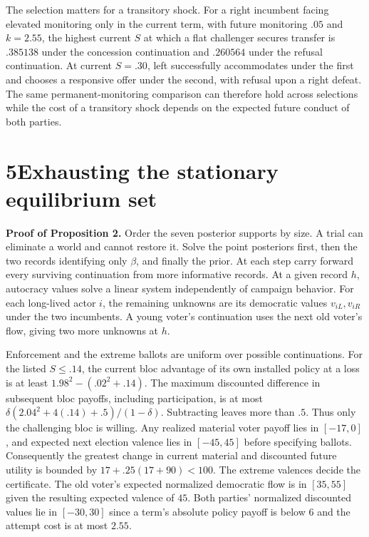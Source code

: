 \documentclass[11pt,letterpaper]{article}
\begin{document}
The selection matters for a transitory shock. For a right incumbent facing elevated monitoring only in the current term, with future monitoring $.05$ and $k=2.55$, the highest current $S$ at which a flat challenger secures transfer is $.385138$ under the concession continuation and $.260564$ under the refusal continuation. At current $S=.30$, left successfully accommodates under the first and chooses a responsive offer under the second, with refusal upon a right defeat. The same permanent-monitoring comparison can therefore hold across selections while the cost of a transitory shock depends on the expected future conduct of both parties.

\newpage
\section*{5\quad Exhausting the stationary equilibrium set}
\textbf{Proof of Proposition 2.} Order the seven posterior supports by size. A trial can eliminate a world and cannot restore it. Solve the point posteriors first, then the two records identifying only $\beta$, and finally the prior. At each step carry forward every surviving continuation from more informative records. At a given record $h$, autocracy values solve a linear system independently of campaign behavior. For each long-lived actor $i$, the remaining unknowns are its democratic values $v_{iL},v_{iR}$ under the two incumbents. A young voter's continuation uses the next old voter's flow, giving two more unknowns at $h$.

Enforcement and the extreme ballots are uniform over possible continuations. For the listed $S\le.14$, the current bloc advantage of its own installed policy at a loss is at least $1.98^2-(.02^2+.14)$. The maximum discounted difference in subsequent bloc payoffs, including participation, is at most $\delta(2.04^2+4(.14)+.5)/(1-\delta)$. Subtracting leaves more than $.5$. Thus only the challenging bloc is willing. Any realized material voter payoff lies in $[-17,0]$, and expected next election valence lies in $[-45,45]$ before specifying ballots. Consequently the greatest change in current material and discounted future utility is bounded by $17+.25(17+90)<100$. The extreme valences decide the certificate. The old voter's expected normalized democratic flow is in $[35,55]$ given the resulting expected valence of $45$. Both parties' normalized discounted values lie in $[-30,30]$ since a term's absolute policy payoff is below $6$ and the attempt cost is at most $2.55$.
\end{document}
